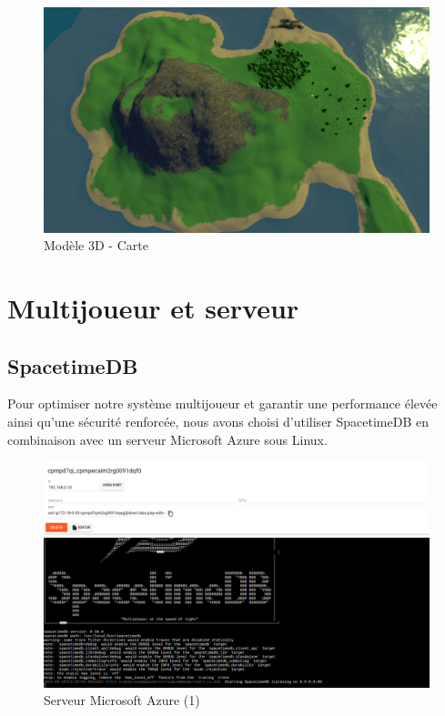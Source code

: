 \documentclass[
	article,			%
	11pt,				%
	oneside,			%
	a4paper,			%
	chapter=TITLE,
	french,			%
	sumario=tradicional
	]{base_nt}
\begin{document}
\begin{figure}[ht]
	\caption{Modèle 3D - Carte}
	\centering
	\includegraphics[width=1\linewidth]{paper21.png}
	\legend{}
	
\end{figure}

\newpage

\section{Multijoueur et serveur}

\subsection{SpacetimeDB}

Pour optimiser notre système multijoueur et garantir une performance élevée ainsi qu'une sécurité renforcée, nous avons choisi d'utiliser SpacetimeDB en combinaison avec un serveur Microsoft Azure sous Linux.

\begin{figure}[ht]
	\caption{Serveur Microsoft Azure (1)}
	\centering
	\includegraphics[width=1\linewidth]{paper12.png}
	\legend{}
	
\end{figure}
\end{document}
